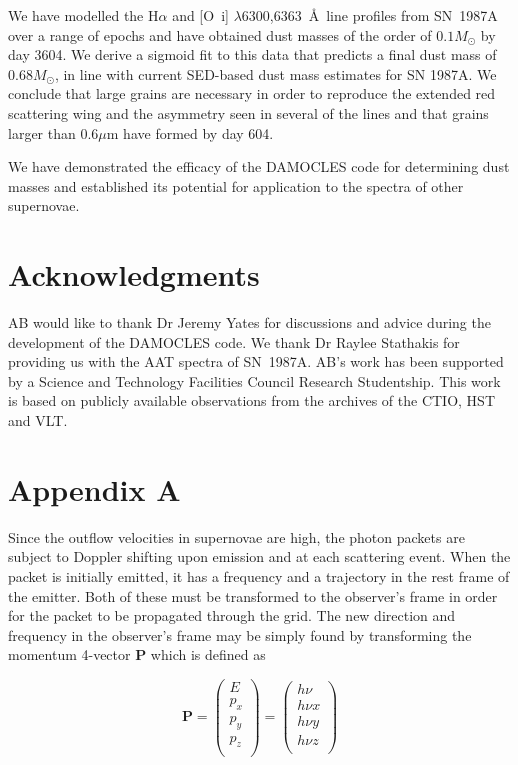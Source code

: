 \documentclass[useAMS,usenatbib,usegraphicx]{mnras}
\begin{document}
We have modelled the H$\alpha$ and [O~{\sc i}] $\lambda$6300,6363~\AA\ line 
profiles 
from SN~1987A over a range of epochs and have obtained dust masses of the order 
of $0.1M_{\odot}$ by day 3604.  We derive a sigmoid fit to this data that 
predicts a final dust mass of 0.68$M_{\odot}$, in line with current SED-based dust mass estimates for SN 1987A.  We conclude 
that large grains are necessary in order to reproduce the extended red 
scattering wing and the asymmetry seen in several of the lines and that grains 
larger than $0.6\mu$m have formed by day 604.

We have demonstrated the efficacy of the DAMOCLES code for determining 
dust masses and established its potential for application to the spectra of other 
supernovae.


\section*{Acknowledgments}

AB would like to thank Dr Jeremy Yates for discussions and advice during 
the development of the DAMOCLES code.  We thank Dr Raylee Stathakis for 
providing us with the AAT spectra of SN~1987A.  AB's work has been 
supported by a Science and Technology Facilities Council Research 
Studentship.  This work is based on publicly available observations from the archives of the CTIO, HST and VLT.

{}


\appendix

\section[]{Appendix A}

Since the outflow velocities in supernovae are high, the photon packets 
are subject to Doppler shifting upon emission and at each scattering event.  
When the packet is initially emitted, it has a frequency and a trajectory 
in the rest frame of the emitter. Both of these must be transformed to the 
observer's frame in order for the packet to be propagated through the 
grid.  The new direction and frequency in the observer's frame may be 
simply found by transforming the momentum 4-vector $\mathbf{P}$ which is 
defined as

\begin{equation}
\mathbf{P}=
\begin{pmatrix}
	E \\
	p_x \\
	p_y \\
	p_z \\
	\end{pmatrix} =
	\begin{pmatrix}
	h \nu \\
	h \nu x \\
	h \nu y \\
	h \nu z \\
	\end{pmatrix}
\end{equation}
\end{document}
